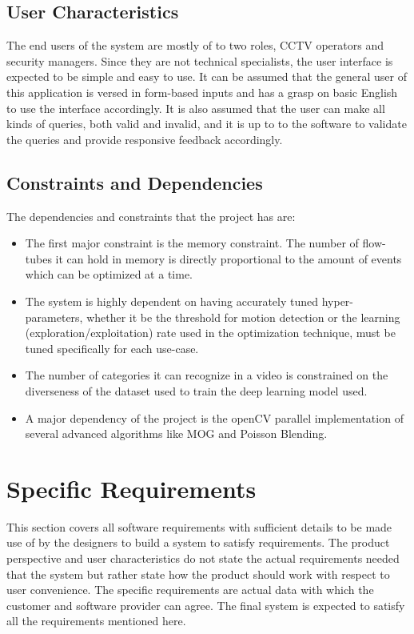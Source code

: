     \subsection{User Characteristics}
    The end users of the system are mostly of to two roles, CCTV operators and
    security managers. Since they are not technical specialists, the user
    interface is expected to be simple and easy to use. It can be assumed that
    the general user of this application is versed in form-based inputs and has
    a grasp on basic English to use the interface accordingly. It is also
    assumed that the user can make all kinds of queries, both valid and invalid,
    and it is up to to the software to validate the queries and provide
    responsive feedback accordingly.

    \subsection{Constraints and Dependencies}
    The dependencies and constraints that the project has are:
    \begin{itemize}
        \item The first major constraint is the memory constraint. The number
        of flow-tubes it can hold in memory is directly proportional to the
        amount of events which can be optimized at a time.
        \item The system is highly dependent on having accurately tuned
        hyper-parameters, whether it be the threshold for motion detection or
        the learning (exploration/exploitation) rate used in the optimization
        technique, must be tuned specifically for each use-case.
        \item The number of categories it can recognize in a video is
        constrained on the diverseness of the dataset used to train the
        deep learning model used.
        \item A major dependency of the project is the \gls{openCV} parallel
        implementation of several advanced algorithms like MOG and Poisson
        Blending.
    \end{itemize}

\section{Specific Requirements}

This section covers all software requirements with sufficient details to be made
use of by the designers to build a system to satisfy requirements. The product
perspective and user characteristics do not state the actual requirements needed
that the system but rather state how the product should work with respect to
user convenience. The specific requirements are actual data with which the
customer and software provider can agree. The final system is expected to
satisfy all the requirements mentioned here.

